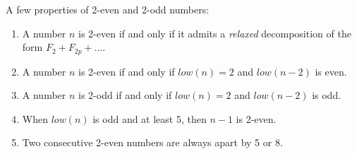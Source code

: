 \documentclass[a4paper,11pt]{article}
\begin{document}
A few properties of 2-even and 2-odd numbers:
\begin{theorem}\label{twoevenodd}
\noindent
\begin{enumerate}
\item A number $n$ is 2-even if and only if it admits
a \emph{relaxed} decomposition of the form $F_2 + F_{2p}+...$.
\item A number $n$ is 2-even if and only if $low(n)=2$ and
$low(n-2)$ is even.
\item A number $n$ is 2-odd if and only if $low(n)=2$ and
$low(n-2)$ is odd.
\item When $low(n)$ is odd and at least 5, then $n-1$ is 2-even.
\item Two consecutive 2-even numbers are always apart by 5 or 8.
\end{enumerate}
\end{theorem}
\end{document}
